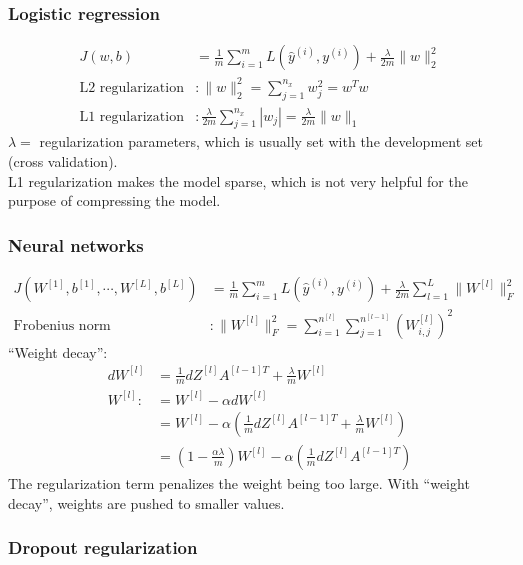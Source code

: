 \subsubsection{Logistic regression}
\begin{align}
J(w,b) &= \frac{1}{m}\sum_{i = 1}^{m}L(\hat{y}^{(i)}, y^{(i)}) + \frac{\lambda}{2m}\|w\|_2^2\\
\text{L2 regularization}&: \|w\|_2^2 = \sum_{j = 1}^{n_x}w_j^2 = w^Tw\\
\text{L1 regularization}&: \frac{\lambda}{2m}\sum_{j = 1}^{n_x}|w_j| = \frac{\lambda}{2m}\|w\|_1
\end{align}
$\lambda = $ regularization parameters, which is usually set with the development set (cross validation).\\
L1 regularization makes the model sparse, which is not very helpful for the purpose of compressing the model.\\

\subsubsection{Neural networks}
\begin{align}
J(W^{[1]}, b^{[1]}, \cdots, W^{[L]}, b^{[L]}) &= \frac{1}{m}\sum_{i = 1}^{m}L(\hat{y}^{(i)}, y^{(i)}) + \frac{\lambda}{2m}\sum_{l=1}^{L}\|W^{[l]}\|_F^2\\
\text{Frobenius norm}&: \| W^{[l]} \|_F^2 = \sum_{i = 1}^{n^{[l]}}\sum_{j = 1}^{n^{[l-1]}}(W_{i,j}^{[l]})^2
\end{align}
``Weight decay'': 
\begin{align*}
dW^{[l]} &=  \frac{1}{m}dZ^{[l]}A^{[l-1]T}+ \frac{\lambda}{m}W^{[l]}\\
W^{[l]} :&= W^{[l]} -\alpha dW^{[l]}\\
	&=W^{[l]} -\alpha  (\frac{1}{m}dZ^{[l]}A^{[l-1]T} + \frac{\lambda}{m}W^{[l]})\\
	&=(1-\frac{\alpha \lambda}{m})W^{[l]} -\alpha ( \frac{1}{m}dZ^{[l]}A^{[l-1]T})
\end{align*}
The regularization term penalizes the weight being too large. With ``weight decay'', weights are pushed to smaller values.


\subsubsection{Dropout regularization}

